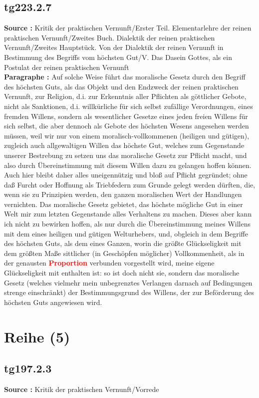 \documentclass[a4paper,12pt,twoside]{book}
\newcommand{\match}[1]{\textcolor{red}{\textbf{#1}}}
\newcommand{\unnumberedsection}[1]{
	\section*{#1}
	\addcontentsline{toc}{section}{#1}
	\markright{#1}
}
\begin{document}
	\subsection*{tg223.2.7} 
	\textbf{Source : }Kritik der praktischen Vernunft/Erster Teil. Elementarlehre der reinen praktischen Vernunft/Zweites Buch. Dialektik der reinen praktischen Vernunft/Zweites Hauptstück. Von der Dialektik der reinen Vernunft in Bestimmung des Begriffs vom höchsten Gut/V. Das Dasein Gottes, als ein Postulat der reinen praktischen Vernunft\\  
	
	\noindent\textbf{Paragraphe : }
	Auf solche Weise führt das moralische Gesetz durch den Begriff des höchsten Guts, als das Objekt und den Endzweck der reinen praktischen Vernunft, zur Religion, d.i. zur Erkenntnis aller Pflichten als göttlicher Gebote, nicht als Sanktionen, d.i. willkürliche für sich selbst zufällige Verordnungen, eines fremden Willens, sondern als wesentlicher Gesetze eines jeden freien Willens für sich selbst, die aber dennoch als Gebote des höchsten Wesens angesehen werden müssen, weil wir nur von einem moralisch-vollkommenen (heiligen und gütigen), zugleich auch allgewaltigen Willen das höchste Gut, welches zum Gegenstande unserer Bestrebung zu setzen uns das moralische Gesetz zur Pflicht macht, und also durch Übereinstimmung mit diesem Willen dazu zu gelangen hoffen können. Auch hier bleibt daher alles uneigennützig und bloß auf Pflicht gegründet; ohne daß Furcht oder Hoffnung als Triebfedern zum Grunde gelegt werden dürften, die, wenn sie zu Prinzipien werden, den ganzen moralischen Wert der Handlungen vernichten. Das moralische Gesetz gebietet, das höchste mögliche Gut in einer Welt mir zum letzten Gegenstande alles Verhaltens zu machen. Dieses aber kann ich nicht zu bewirken hoffen, als nur durch die Übereinstimmung meines Willens mit dem eines heiligen und gütigen Welturhebers, und, obgleich in dem Begriffe des höchsten Guts, als dem eines Ganzen, worin die größte Glückseligkeit mit dem größten Maße sittlicher (in Geschöpfen möglicher) Vollkommenheit, als in der genausten \match{Proportion} verbunden vorgestellt wird, meine eigene Glückseligkeit mit enthalten ist: so ist doch nicht sie, sondern das moralische Gesetz (welches vielmehr mein unbegrenztes Verlangen darnach auf Bedingungen strenge einschränkt) der Bestimmungsgrund des Willens, der zur Beförderung des höchsten Guts angewiesen wird. 
	
	\unnumberedsection{Reihe (5)} 
	\subsection*{tg197.2.3} 
	\textbf{Source : }Kritik der praktischen Vernunft/Vorrede\\  
	
\end{document}
